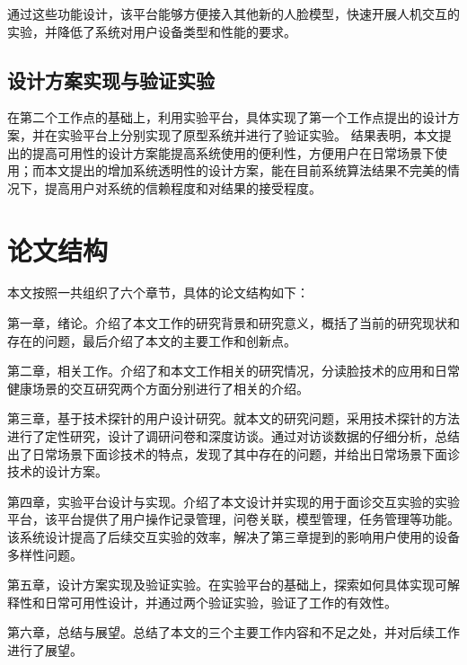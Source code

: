 通过这些功能设计，该平台能够方便接入其他新的人脸模型，快速开展人机交互的实验，并降低了系统对用户设备类型和性能的要求。


\subsection{设计方案实现与验证实验}

在第二个工作点的基础上，利用实验平台，具体实现了第一个工作点提出的设计方案，并在实验平台上分别实现了原型系统并进行了验证实验。
结果表明，本文提出的提高可用性的设计方案能提高系统使用的便利性，方便用户在日常场景下使用；而本文提出的增加系统透明性的设计方案，能在目前系统算法结果不完美的情况下，提高用户对系统的信赖程度和对结果的接受程度。


\section{论文结构}
本文按照一共组织了六个章节，具体的论文结构如下：

第一章，绪论。介绍了本文工作的研究背景和研究意义，概括了当前的研究现状和存在的问题，最后介绍了本文的主要工作和创新点。

第二章，相关工作。介绍了和本文工作相关的研究情况，分读脸技术的应用和日常健康场景的交互研究两个方面分别进行了相关的介绍。

第三章，基于技术探针的用户设计研究。就本文的研究问题，采用技术探针的方法进行了定性研究，设计了调研问卷和深度访谈。通过对访谈数据的仔细分析，总结出了日常场景下面诊技术的特点，发现了其中存在的问题，并给出日常场景下面诊技术的设计方案。

第四章，实验平台设计与实现。介绍了本文设计并实现的用于面诊交互实验的实验平台，该平台提供了用户操作记录管理，问卷关联，模型管理，任务管理等功能。该系统设计提高了后续交互实验的效率，解决了第三章提到的影响用户使用的设备多样性问题。

第五章，设计方案实现及验证实验。在实验平台的基础上，探索如何具体实现可解释性和日常可用性设计，并通过两个验证实验，验证了工作的有效性。

第六章，总结与展望。总结了本文的三个主要工作内容和不足之处，并对后续工作进行了展望。
